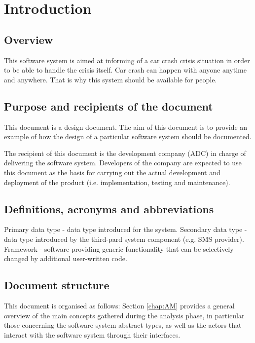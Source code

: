 \chapter{Introduction}
\label{chap:introduction}


\section{Overview}
This software system is aimed at informing of a car crash crisis situation in
order to be able to handle the crisis itself. Car crash can happen with anyone
anytime and anywhere. That is why this system should be available for people.


\section{Purpose and recipients of the document}
This document is a design document. The aim of this document is to provide an
example of how the design of a particular software system should be documented. 

The recipient of this document is the development company (ADC) in charge
of delivering the software system. Developers of the company are
expected to use this document as the basis for carrying out the actual
development and deployment of the product (i.e. implementation, testing
and maintenance).



\section{Definitions, acronyms and abbreviations}
Primary data type - data type introduced for the system.
Secondary data type - data type introduced by the third-pard system component (e.g. SMS provider).
Framework - software providing generic functionality that can be selectively changed by additional user-written code.


  
\section{Document structure} 
This document is organised as follows: Section \ref{chap:AM} provides a general
overview of the main concepts gathered during the analysis phase, in particular those concerning the software system abstract
types, as well as the actors that interact with the
software system through their interfaces. 

